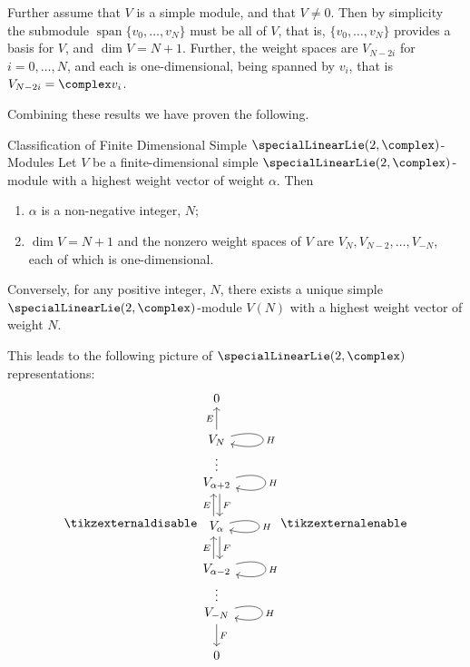 \documentclass[fleqn]{NotesClass}
\DeclareMathOperator{\Span}{span}
\begin{document}
    Further assume that \(V\) is a simple module, and that \(V \ne 0\).
    Then by simplicity the submodule \(\Span\{v_0, \dotsc, v_N\}\) must be all of \(V\), that is, \(\{v_0, \dotsc, v_N\}\) provides a basis for \(V\), and \(\dim V = N + 1\).
    Further, the weight spaces are \(V_{N-2i}\) for \(i = 0, \dotsc, N\), and each is one-dimensional, being spanned by \(v_i\), that is \(V_{N - 2i} = \complex v_i\).
    
    Combining these results we have proven the following.
    
    \begin{thm}{Classification of Finite Dimensional Simple \(\specialLinearLie(2, \complex)\)-Modules}{}
        Let \(V\) be a finite-dimensional simple \(\specialLinearLie(2, \complex)\)-module with a highest weight vector of weight \(\alpha\).
        Then
        \begin{enumerate}
            \item \(\alpha\) is a non-negative integer, \(N\);
            \item \(\dim V = N + 1\) and the nonzero weight spaces of \(V\) are \(V_N, V_{N-2}, \dotsc, V_{-N}\), each of which is one-dimensional.
        \end{enumerate}
        Conversely, for any positive integer, \(N\), there exists a unique simple \(\specialLinearLie(2, \complex)\)-module \(V(N)\) with a highest weight vector of weight \(N\).
    \end{thm}
    
    This leads to the following picture of \(\specialLinearLie(2, \complex)\) representations:
    \begin{equation}
        \hfil
        \tikzexternaldisable
        \begin{tikzcd}
            0 \\
            V_{N} \arrow[u, "E"] \arrow[d, phantom, "\vdots"] \arrow[loop right, looseness=15, "H"]\\
            V_{\alpha + 2} \arrow[d, shift left, "F"] \arrow[loop right, looseness=10, "H"]\\
            V_{\alpha} \arrow[d, shift left, "F"] \arrow[u, shift left, "E"] \arrow[loop right, looseness=15, "H"]\\
            V_{\alpha - 2} \arrow[u, shift left, "E"] \arrow[loop right, looseness=10, "H"]\\
            V_{-N} \arrow[d, "F"] \arrow[u, phantom, "\vdots"] \arrow[loop right, looseness=10, "H"]\\
            0
        \end{tikzcd}
        \tikzexternalenable
    \end{equation}
    
\end{document}
